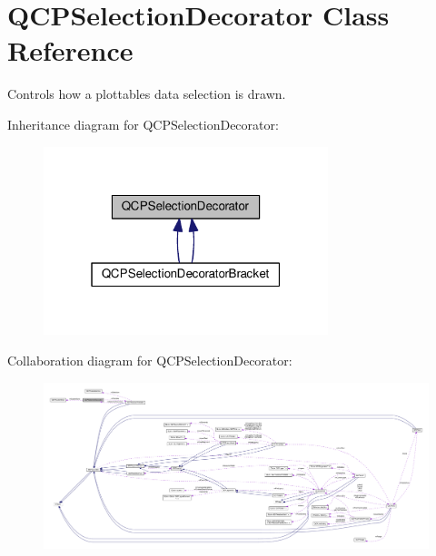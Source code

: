 \hypertarget{class_q_c_p_selection_decorator}{}\section{Q\+C\+P\+Selection\+Decorator Class Reference}
\label{class_q_c_p_selection_decorator}


Controls how a plottable\textquotesingle{}s data selection is drawn.  




Inheritance diagram for Q\+C\+P\+Selection\+Decorator\+:\nopagebreak
\begin{figure}[H]
\begin{center}
\leavevmode
\includegraphics[width=235pt]{class_q_c_p_selection_decorator__inherit__graph}
\end{center}
\end{figure}


Collaboration diagram for Q\+C\+P\+Selection\+Decorator\+:\nopagebreak
\begin{figure}[H]
\begin{center}
\leavevmode
\includegraphics[width=350pt]{class_q_c_p_selection_decorator__coll__graph}
\end{center}
\end{figure}

